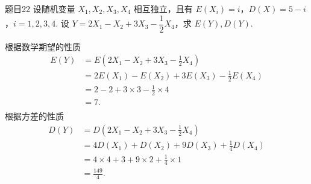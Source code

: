 \begin{question}{题目22}
    设随机变量 $X_1, X_2, X_3, X_4$ 相互独立，且有 $E(X_i)=i$，$D(X) = 5-i$，$i = 1, 2, 3, 4$. 设 $Y = 2X_1 - X_2 + 3X_3 - \dfrac{1}{2}X_4$，求 $E(Y), D(Y)$.
\end{question}
\begin{solution}
    根据数学期望的性质
    $$
        \begin{aligned}
            E(Y)
             & = E\left(2X_1 - X_2 + 3X_3 - \frac{1}{2}X_4\right) \\
             & = 2E(X_1) - E(X_2) + 3E(X_3) - \frac{1}{2}E(X_4)   \\
             & = 2 - 2 + 3 \times 3 - \frac{1}{2} \times 4        \\
             & = 7.                                               \\
        \end{aligned}
    $$
    根据方差的性质
    $$
        \begin{aligned}
            D(Y)
             & = D\left(2X_1 - X_2 + 3X_3 - \frac{1}{2}X_4\right)   \\
             & = 4D(X_1) + D(X_2) + 9D(X_3) + \frac{1}{4}D(X_4)     \\
             & = 4 \times 4 + 3 + 9 \times 2 + \frac{1}{4} \times 1 \\
             & = \frac{149}{4}.
        \end{aligned}
    $$
\end{solution}



